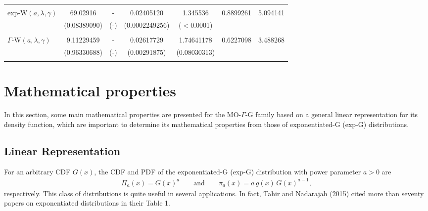 \documentclass[12pt,a4paper]{article} %
\begin{document}
\begin{table}[htb!]
\begin{tabular}{lcccccc}
 & & & & &  \\
 exp-W$(a,\lambda,\gamma)$   &    69.02916  & - &   0.02405120 & 1.345536 &   0.8899261   & 5.094141 \\
                          &   (0.08389090) & (-) & (0.0002249256) & ($<$0.0001)   &  & \\

 & & & & &  \\
 $\Gamma$-W$(a,\lambda,\gamma)$    & 9.11229459   & - &  0.02617729 & 1.74641178 &    0.6227098 & 3.488268  \\
                             &  (0.96330688)&  (-)&  (0.00291875) & (0.08030313)     &  & \\

 & & & & &  \\




                                                    \hline
\end{tabular}
\end{table}





\section{Mathematical properties}\label{properties}


In this section, some main mathematical properties are presented for the MO-$\Gamma$-G family
based on a general linear representation for its density function, which are important
to determine its mathematical properties from those of exponentiated-G (exp-G) distributions.

\subsection{Linear Representation}


For an arbitrary CDF $G(x)$, the CDF and PDF of the exponentiated-G (exp-G) distribution with power parameter $a>0$ are
\begin{eqnarray*}
\Pi_a(x)=G(x)^a\qquad\text{and}\qquad\pi_a(x)=a\,g(x)\,G(x)^{a-1},
\end{eqnarray*}
respectively. This class of distributions is quite useful in several applications. In fact, Tahir and Nadarajah (2015)
cited more than seventy papers on exponentiated distributions in their Table 1.
\end{document}
